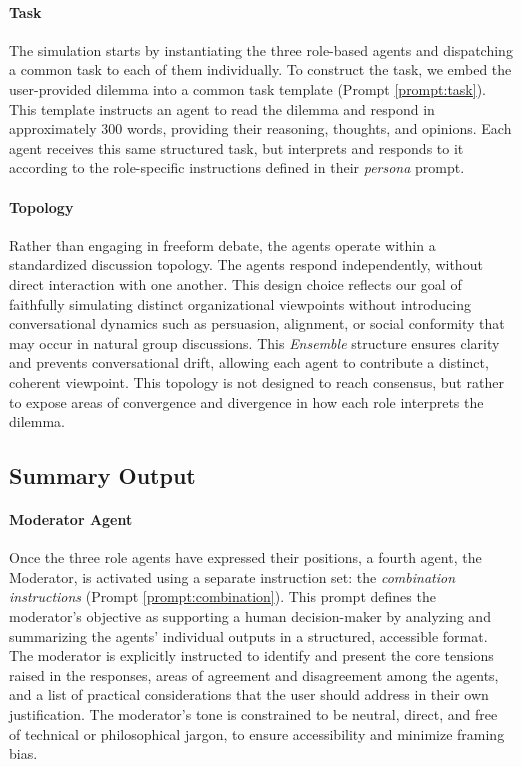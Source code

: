 \paragraph{Task}{
  The simulation starts by instantiating the three role-based agents and dispatching a common task to each of them individually. To construct the task, we embed the user-provided dilemma into a common task template (Prompt \ref{prompt:task}). This template instructs an agent to read the dilemma and respond in approximately 300 words, providing their reasoning, thoughts, and opinions. Each agent receives this same structured task, but interprets and responds to it according to the role-specific instructions defined in their \textit{persona} prompt.
}

\paragraph{Topology}{
  Rather than engaging in freeform debate, the agents operate within a standardized discussion topology. The agents respond independently, without direct interaction with one another. This design choice reflects our goal of faithfully simulating distinct organizational viewpoints without introducing conversational dynamics such as persuasion, alignment, or social conformity that may occur in natural group discussions. This \textit{Ensemble} structure ensures clarity and prevents conversational drift, allowing each agent to contribute a distinct, coherent viewpoint. This topology is not designed to reach consensus, but rather to expose areas of convergence and divergence in how each role interprets the dilemma.
}

\subsection{Summary Output}

\paragraph{Moderator Agent}{
  Once the three role agents have expressed their positions, a fourth agent, the Moderator, is activated using a separate instruction set: the \textit{combination instructions} (Prompt \ref{prompt:combination}). This prompt defines the moderator's objective as supporting a human decision-maker by analyzing and summarizing the agents' individual outputs in a structured, accessible format. The moderator is explicitly instructed to identify and present the core tensions raised in the responses, areas of agreement and disagreement among the agents, and a list of practical considerations that the user should address in their own justification. The moderator's tone is constrained to be neutral, direct, and free of technical or philosophical jargon, to ensure accessibility and minimize framing bias.
}


